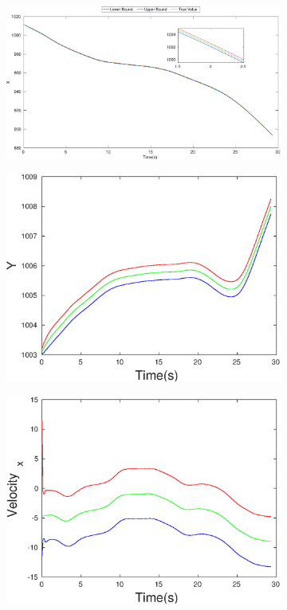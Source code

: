 \begin{figure}[h]
\begin{subfigure}{.5\linewidth}
\centering
\includegraphics[width=\linewidth]{figures/Frad/s3caSMX}
\end{subfigure}
\begin{subfigure}{.5\linewidth}
\centering
\includegraphics[width=\linewidth]{figures/Frad/s3caSMY}
\end{subfigure}
\begin{subfigure}{.5\linewidth}
\centering
\includegraphics[width=.9\linewidth]{figures/Frad/s3caSMVelocity_x}

\end{subfigure}
\end{figure}
